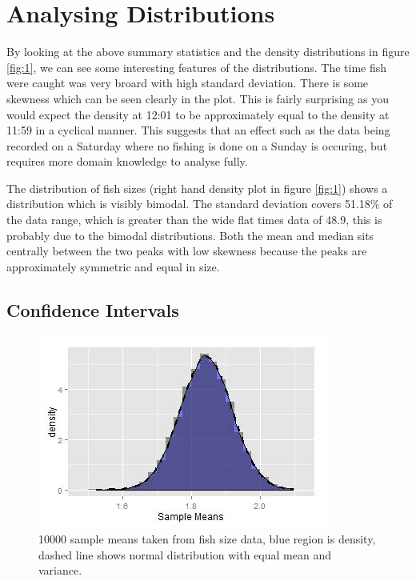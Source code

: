 \documentclass{article}\usepackage[]{graphicx}\usepackage[]{color}
\begin{document}
\section{Analysing Distributions}

By looking at the above summary statistics and the density distributions in figure \ref{fig:1}, we can see some interesting features of the distributions. The time fish were caught was very broard with high standard deviation. There is some skewness which can be seen clearly in the plot. This is fairly surprising as you would expect the density at 12:01 to be approximately equal to the density at 11:59 in a cyclical manner. This suggests that an effect such as the data being recorded on a Saturday where no fishing is done on a Sunday is occuring, but requires more domain knowledge to analyse fully.

The distribution of fish sizes (right hand density plot in figure \ref{fig:1}) shows a distribution which is visibly bimodal. The standard deviation covers 51.18\% of the data range, which is greater than the wide flat times data of 48.9, this is probably due to the bimodal distributions. Both the mean and median sits centrally between the two peaks with low skewness because the peaks are approximately symmetric and equal in size. 

\subsection{Confidence Intervals}



\begin{figure}
  \includegraphics[width=0.9\linewidth]{figure3.jpg}
  \caption{10000 sample means taken from fish size data, blue region is density, dashed line shows normal distribution with equal mean and variance.}
  \label{fig:three}
\end{figure}
\end{document}
